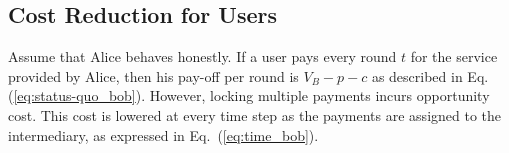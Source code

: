 \documentclass[runningheads]{llncs}
\newcommand{\sys}{Promise\xspace}
\begin{document}




\subsection{Cost Reduction for Users}
Assume that Alice behaves honestly.
If a user pays every round $t$ for the service provided by Alice, then his pay-off per round is $V_B - p - c$ as described in Eq. (\ref{eq:status-quo_bob}). %
However, locking multiple payments incurs opportunity cost.
This cost is lowered at every time step as the payments are assigned to the intermediary, as expressed in Eq.~(\ref{eq:time_bob}).
\end{document}
